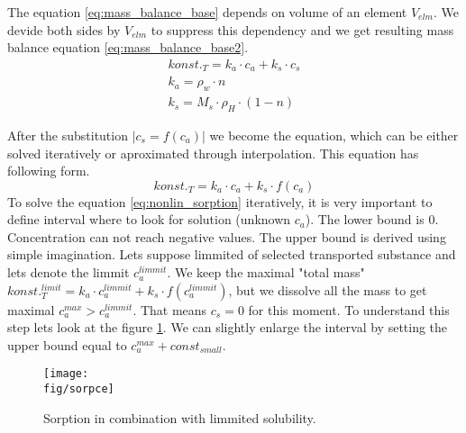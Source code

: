 The equation \ref{eq:mass_balance_base} depends on volume of an element $V_{elm}$. We devide both sides by $V_{elm}$ to suppress this dependency and we get resulting mass balance equation \ref{eq:mass_balance_base2}.
\begin{equation}
 \begin{array}{l}
  konst._T = k_a\cdot c_a + k_s\cdot c_s\\
  k_a = \rho_w\cdot n\\
  k_s = M_s \cdot\rho_H\cdot(1-n)
 \end{array}
 \label{eq:mass_balance_base2}
\end{equation}

After the substitution $|c_s = f(c_a)|$ we become the equation, which can be either solved iteratively or aproximated through interpolation. This equation has following form.
\begin{equation}
 konst._T = k_a\cdot c_a + k_s\cdot f(c_a)
 \label{eq:nonlin_sorption}
\end{equation}
To solve the equation \ref{eq:nonlin_sorption} iteratively, it is very important to define interval where to look for solution (unknown $c_a$). The lower bound is $0$. Concentration can not reach negative values. The upper bound is derived using simple imagination. Lets suppose limmited  of selected transported substance and lets denote the limmit $c_a^{limmit}$. We keep the maximal "total mass" $konst._T^{limit}= k_a\cdot c_a^{limmit} + k_s\cdot f(c_a^{limmit})$, but we dissolve all the mass to get maximal $c_a^{max} > c_a^{limmit}$. That means $c_s = 0$ for this moment. To understand this step lets look at the figure \ref{fig:sorpce}. We can slightly enlarge the interval by setting the upper bound equal to $c_a^{max} + const_{small}$.

\begin{figure}[ht!]
 \centering
 \texttt{[image: \\fig/sorpce]}
 \caption{Sorption in combination with limmited solubility.}
 \label{fig:sorpce}
\end{figure}


